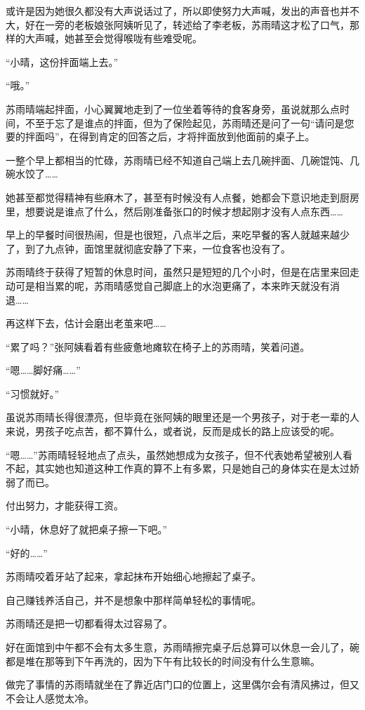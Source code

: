 或许是因为她很久都没有大声说话过了，所以即使努力大声喊，发出的声音也并不大，好在一旁的老板娘张阿姨听见了，转述给了李老板，苏雨晴这才松了口气，那样的大声喊，她甚至会觉得喉咙有些难受呢。

“小晴，这份拌面端上去。”

“哦。”

苏雨晴端起拌面，小心翼翼地走到了一位坐着等待的食客身旁，虽说就那么点时间，不至于忘了是谁点的拌面，但为了保险起见，苏雨晴还是问了一句“请问是您要的拌面吗”，在得到肯定的回答之后，才将拌面放到他面前的桌子上。

一整个早上都相当的忙碌，苏雨晴已经不知道自己端上去几碗拌面、几碗馄饨、几碗水饺了……

她甚至都觉得精神有些麻木了，甚至有时候没有人点餐，她都会下意识地走到厨房里，想要说是谁点了什么，然后刚准备张口的时候才想起刚才没有人点东西……

早上的早餐时间很热闹，但是也很短，八点半之后，来吃早餐的客人就越来越少了，到了九点钟，面馆里就彻底安静了下来，一位食客也没有了。

苏雨晴终于获得了短暂的休息时间，虽然只是短短的几个小时，但是在店里来回走动可是相当累的呢，苏雨晴感觉自己脚底上的水泡更痛了，本来昨天就没有消退……

再这样下去，估计会磨出老茧来吧……

“累了吗？”张阿姨看着有些疲惫地瘫软在椅子上的苏雨晴，笑着问道。

“嗯……脚好痛……”

“习惯就好。”

虽说苏雨晴长得很漂亮，但毕竟在张阿姨的眼里还是一个男孩子，对于老一辈的人来说，男孩子吃点苦，都不算什么，或者说，反而是成长的路上应该受的呢。

“嗯……”苏雨晴轻轻地点了点头，虽然她想成为女孩子，但不代表她希望被别人看不起，其实她也知道这种工作真的算不上有多累，只是她自己的身体实在是太过娇弱了而已。

付出努力，才能获得工资。

“小晴，休息好了就把桌子擦一下吧。”

“好的……”

苏雨晴咬着牙站了起来，拿起抹布开始细心地擦起了桌子。

自己赚钱养活自己，并不是想象中那样简单轻松的事情呢。

苏雨晴还是把一切都看得太过容易了。

好在面馆到中午都不会有太多生意，苏雨晴擦完桌子后总算可以休息一会儿了，碗都是堆在那等到下午再洗的，因为下午有比较长的时间没有什么生意嘛。

做完了事情的苏雨晴就坐在了靠近店门口的位置上，这里偶尔会有清风拂过，但又不会让人感觉太冷。

